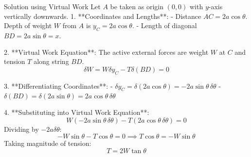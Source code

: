 \documentclass[11pt,a4paper]{article}
\begin{document}
\begin{center}
\end{center}

\begin{proofbox}{Solution using Virtual Work}
Let $A$ be taken as origin $(0,0)$ with $y$-axis vertically downwards.
1. **Coordinates and Lengths**:
   - Distance $AC = 2a \cos\theta$. Depth of weight $W$ from $A$ is $y_C = 2a \cos\theta$.
   - Length of diagonal $BD = 2a \sin\theta = x$.

2. **Virtual Work Equation**:
   The active external forces are weight $W$ at $C$ and tension $T$ along string $BD$.
   \begin{equation}
   \delta W = W \delta y_C - T \delta (BD) = 0
   \end{equation}

3. **Differentiating Coordinates**:
   - $\delta y_C = \delta(2a \cos\theta) = -2a \sin\theta \, \delta\theta$
   - $\delta(BD) = \delta(2a \sin\theta) = 2a \cos\theta \, \delta\theta$

4. **Substituting into Virtual Work Equation**:
   \[
   W (-2a \sin\theta \, \delta\theta) - T (2a \cos\theta \, \delta\theta) = 0
   \]
   Dividing by $-2a \delta\theta$:
   \[
   -W \sin\theta - T \cos\theta = 0 \implies T \cos\theta = -W \sin\theta
   \]
   Taking magnitude of tension:
   \begin{equation}
   T = 2 W \tan\theta
   \end{equation}
\end{proofbox}
\end{document}
